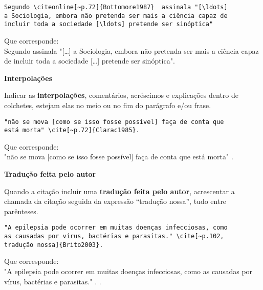 \begin{alineas}
\begin{verbatim}
Segundo \citeonline[~p.72]{Bottomore1987}  assinala "[\ldots]  
a Sociologia, embora não pretenda ser mais a ciência capaz de 
incluir toda a sociedade [\ldots] pretende ser sinóptica"
\end{verbatim}

Que corresponde:\\

Segundo   assinala "[\ldots]  a Sociologia, embora não pretenda ser mais a ciência capaz de incluir toda a sociedade [\ldots] pretende ser sinóptica".\\ 

\item

\textbf{Interpolações}

Indicar as \textbf{interpolações}, comentários, acréscimos e explicações dentro de colchetes, estejam elas no meio ou no fim do parágrafo e/ou frase.

\begin{verbatim}
"não se mova [como se isso fosse possível] faça de conta que 
está morta" \cite[~p.72]{Clarac1985}.
\end{verbatim}

Que corresponde:\\

"não se mova [como se isso fosse possível] faça de conta que 
está morta" \cite[~p.72]{Clarac1985}. \\

\item

\textbf{Tradução feita pelo autor}

Quando a citação incluir uma \textbf{tradução feita pelo autor}, acrescentar a chamada da citação seguida da expressão “tradução nossa”, tudo entre parênteses.

\begin{verbatim}
"A epilepsia pode ocorrer em muitas doenças infecciosas, como 
as causadas por vírus, bactérias e parasitas." \cite[~p.102,
tradução nossa]{Brito2003}.
\end{verbatim}

Que corresponde:\\

"A epilepsia pode ocorrer em muitas doenças infecciosas, como 
as causadas por vírus, bactérias e parasitas." . \cite[~p.102, tradução nossa]{Brito2003}.\\
\end{alineas}

